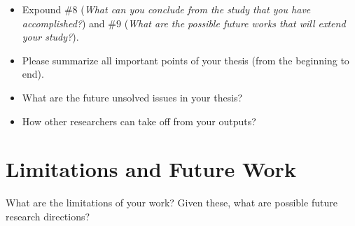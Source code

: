 \label{ch:conclusion}

\begin{itemize}
    \item Expound \#8 (\emph{What can you conclude from the study that you have accomplished?}) and \#9 (\emph{What are the possible future works that will extend your study?}).
    \item Please summarize all important points of your thesis (\ie from the beginning to end).
    \item What are the future unsolved issues in your thesis?
    \item How other researchers can take off from your outputs?
\end{itemize}

\section{Limitations and Future Work}

What are the limitations of your work? Given these, what are possible future research directions?
